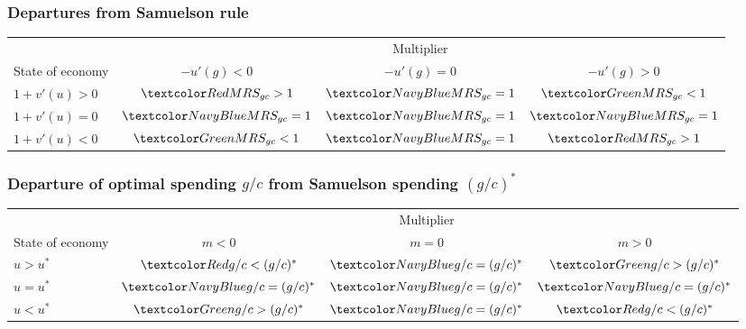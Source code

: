 \documentclass[11pt,aspectratio=169,xcolor={dvipsnames},hyperref={pdftex,pdfpagemode=UseNone,hidelinks,pdfdisplaydoctitle=true},usepdftitle=false]{beamer}
\begin{document}
\begin{frame}
\frametitle{Departures from Samuelson rule}
\begin{table}
\begin{tabular*}{\textwidth}{@{\extracolsep\fill}lccc}
& \multicolumn{3}{c}{Multiplier} \\ 
\cmidrule{2-4}
State of economy & $-u'(g)<0$ & $-u'(g) = 0$ & $-u'(g) > 0$\\
\toprule
$1 + v'(u)>0$  & $\alr{MRS_{gc}>1}$  & $\alb{MRS_{gc}=1}$ & $\alg{MRS_{gc}<1}$ \\
$1 + v'(u)=0$ & $\alb{MRS_{gc}=1}$ & $\alb{MRS_{gc}=1}$  & $\alb{MRS_{gc}=1}$ \\ 
$1 + v'(u)<0$ & $\alg{MRS_{gc}<1}$ & $\alb{MRS_{gc}=1}$ & $\alr{MRS_{gc}>1}$ \\ 
\bottomrule
\end{tabular*}
\end{table}
\end{frame}

\begin{frame}
\frametitle{Departure of optimal spending $g/c$ from Samuelson spending $(g/c)^*$}
\begin{table}
\begin{tabular*}{\textwidth}{@{\extracolsep\fill}lccc}
& \multicolumn{3}{c}{Multiplier} \\ 
\cmidrule{2-4}
State of economy & $m<0$ & $m = 0$ & $m > 0$\\
\toprule
$u>u^{*}$  & $\alr{g/c<(g/c)^{*}}$  & $\alb{g/c=(g/c)^{*}}$ & $\alg{g/c>(g/c)^{*}}$ \\
$u=u^{*}$ & $\alb{g/c=(g/c)^{*}}$ & $\alb{g/c=(g/c)^{*}}$  & $\alb{g/c=(g/c)^{*}}$ \\ 
$u<u^{*}$ & $\alg{g/c>(g/c)^{*}}$ & $\alb{g/c=(g/c)^{*}}$ & $\alr{g/c<(g/c)^{*}}$ \\ 
\bottomrule
\end{tabular*}
\end{table}
\end{frame}
\end{document}
